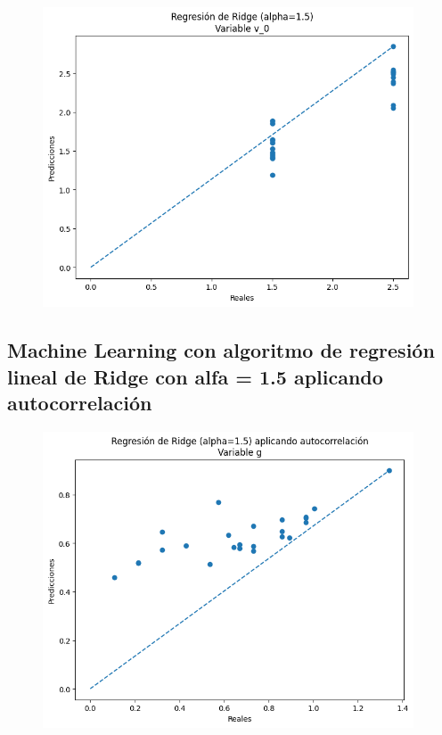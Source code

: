 \documentclass[oneside,openright,titlepage,numbers=noenddot,openany,headinclude,footinclude=true,
cleardoublepage=empty,abstractoff,BCOR=5mm,paper=a4,fontsize=12pt,main=spanish]{scrreprt}
\begin{document}
\begin{figure}[H]
	\centering
	\includegraphics[width=11cm]{Regresión de Ridge (alpha=1.5) Variable v_0.png}
\end{figure}

\subsection{Machine Learning con algoritmo de regresión lineal de Ridge con alfa = 1.5 aplicando autocorrelación}

\begin{figure}[H]
	\centering
	\includegraphics[width=11cm]{Regresión de Ridge (alpha=1.5) aplicando autocorrelación Variable g.png}
\end{figure}
\end{document}
